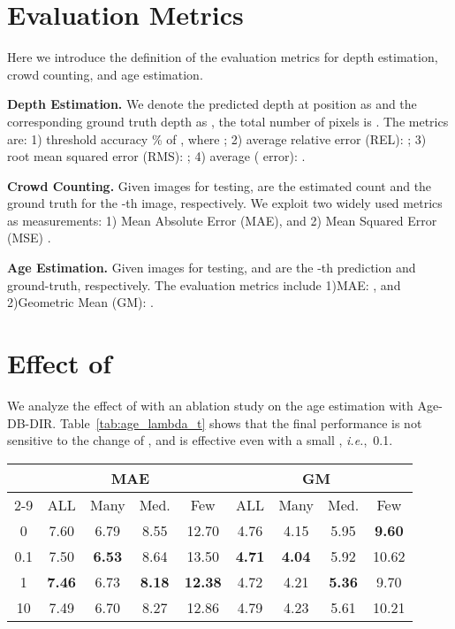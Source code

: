 \documentclass{article} \usepackage{iclr2023_conference,times}
\makeatletter
\newcommand*{\ie}{i.e.\@\xspace}
\def\ie{\mbox{\textit{i.e.}, }}
\def\shihao{\textcolor{black}}
\makeatother
\begin{document}
\section{Evaluation Metrics}
\label{appendix_E}
Here we introduce the definition of the evaluation metrics for depth estimation, crowd counting, and age estimation.

\textbf{Depth Estimation.} We denote the predicted depth at position  as  and the corresponding ground truth depth as , the total number of pixels is . 
The metrics are: 
1) threshold accuracy  \% of , where ;
2) average relative error (REL): ;
3) root mean squared error (RMS):  ;
4) average ( error): .

\textbf{Crowd Counting.} Given  images for testing, \shihao{} are the estimated count and the ground truth for the -th image, respectively. We exploit two widely used metrics as measurements:
1) Mean Absolute Error (MAE), and 
2) Mean Squared Error (MSE) .

\textbf{Age Estimation.} Given  images for testing,  and  are the -th prediction and ground-truth, respectively. The evaluation metrics include 
1)MAE: , and 
2)Geometric Mean (GM): .


\section{Effect of }
\label{sec_lambdat}

We analyze the effect of  with an ablation study on the age estimation with Age-DB-DIR.
Table~\ref{tab:age_lambda_t} shows that the final performance is not sensitive to the change of , and  is effective even with a small , \ie 0.1.


\begin{table*}[h]
	\caption{Results on AgeDB-DIR. 
\textbf{Bold} numbers indicate the best performance.
	}
	\label{tab:age_lambda_t}
	\centering
		\begin{tabular}{c|cccc|cccc}
			\hline
			\multirow{2}[0]{*}{} & \multicolumn{4}{c|}{MAE~} & \multicolumn{4}{c}{GM~}  \\
 			\cline{2-9}
 			
			& ALL & Many & Med. & Few & ALL & Many & Med. & Few\\
			\hline
			0 & 7.60 & 6.79 & 8.55 & 12.70 & 4.76 & 4.15 & 5.95 & \textbf{9.60} \\
0.1 & 7.50 & \textbf{6.53} & 8.64 & 13.50 & \textbf{4.71} & \textbf{4.04} & 5.92 & 10.62 \\
			1 & \textbf{7.46} & 6.73 & \textbf{8.18} & \textbf{12.38} & 4.72 & 4.21 & \textbf{5.36} & 9.70 \\
			10 & 7.49 & 6.70 & 8.27 & 12.86 & 4.79 & 4.23 & 5.61 & 10.21 \\
			\hline
		\end{tabular}
\end{table*}
\end{document}

